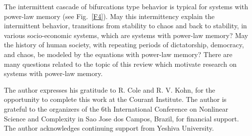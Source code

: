 \documentclass[graybox]{svmult}
\begin{document}
The intermittent cascade of bifurcations type behavior is typical for systems with power-law memory (see Fig.~\ref{F4}). May this intermittency explain the intermittent behavior, transitions from stability to chaos and back to stability, in various socio-economic systems, which are systems with power-law memory? May the history of human society, with
repeating periods of dictatorship, democracy, and chaos, be modeled by the equations with power-law memory? There are many questions related to the topic of this review which motivate research on systems with power-law memory.

 






\begin{acknowledgement}  
The author expresses his gratitude to R. Cole and R. V. Kohn, 
for the opportunity to complete this work at the Courant Institute. 
The author is grateful to the organizers of the 6th International Conference on Nonlinear Science and Complexity in Sao Jose dos Campos, Brazil, for financial support. The author acknowledges continuing support from Yeshiva University.
\end{acknowledgement}


\end{document}
